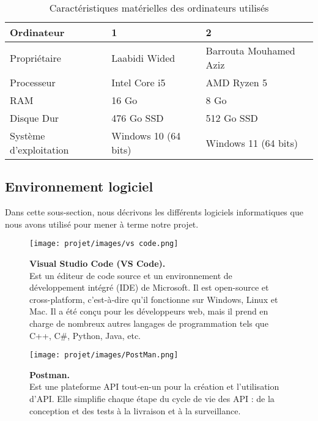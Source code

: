 \begin{table}[H]
\centering
\begin{tabular}{|l|l|l|}
\hline
\textbf{Ordinateur} & \textbf{1} & \textbf{2} \\ \hline
Propriétaire & Laabidi Wided & Barrouta Mouhamed Aziz \\ \hline
Processeur & Intel Core i5 & AMD Ryzen 5 \\ \hline
RAM & 16 Go & 8 Go \\ \hline
Disque Dur & 476 Go SSD & 512 Go SSD \\ \hline
Système d’exploitation & Windows 10 (64 bits) & Windows 11 (64 bits) \\ \hline
\end{tabular}
\caption{Caractéristiques matérielles des ordinateurs utilisés}
\label{tab:environnement_materiel}
\end{table}
\subsection{Environnement logiciel}
Dans cette sous-section, nous décrivons les différents logiciels informatiques
que nous avons utilisé pour mener à terme notre projet.
\begin{figure}[H]
    \centering
    \begin{minipage}[c]{0.3\textwidth}
      \texttt{[image: projet/images/vs code.png]}
    \end{minipage}
    \hspace{1cm}
    \begin{minipage}[c]{0.6\textwidth}
        \textbf{Visual Studio Code (VS Code).}\\[0.5em]
        Est un éditeur de code source et un environnement de développement intégré (IDE) de Microsoft. Il est open-source et cross-platform, c’est-à-dire qu’il fonctionne sur Windows, Linux et Mac. Il a été conçu pour les développeurs web, mais il prend en charge de nombreux autres langages de programmation tels que C++, C#, Python, Java, etc.
    \end{minipage}
\end{figure}

\vspace{0.5cm}

\begin{figure}[H]
    \centering
    \begin{minipage}[c]{0.3\textwidth}
        \texttt{[image: projet/images/PostMan.png]}
    \end{minipage}
    \hspace{1cm}
    \begin{minipage}[c]{0.6\textwidth}
        \textbf{Postman.}\\[0.5em]
        Est une plateforme API tout-en-un pour la création et l'utilisation d'API. Elle simplifie chaque étape du cycle de vie des API : de la conception et des tests à la livraison et à la surveillance. \cite{ref5}
    \end{minipage}
\end{figure}

